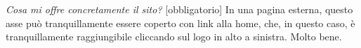 \textit{Cosa mi offre concretamente il sito?} [obbligatorio]\newline
In una pagina esterna, questo asse può tranquillamente essere coperto con link alla home, che, in questo caso, è tranquillamente raggiungibile cliccando sul logo in alto a sinistra. Molto bene.